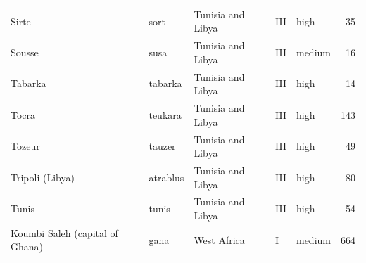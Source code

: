 \documentclass[11pt,a4paper]{article}
\begin{document}
{\begin{longtable}{p{4.6cm}p{3.0cm}p{3.6cm}llr}
Sirte & sort & Tunisia and Libya & III & high & 35\\
Sousse & susa & Tunisia and Libya & III & medium & 16\\
Tabarka & tabarka & Tunisia and Libya & III & high & 14\\
Tocra & teukara & Tunisia and Libya & III & high & 143\\
Tozeur & tauzer & Tunisia and Libya & III & high & 49\\
Tripoli (Libya) & atrablus & Tunisia and Libya & III & high & 80\\
Tunis & tunis & Tunisia and Libya & III & high & 54\\
Koumbi Saleh (capital of Ghana) & gana & West Africa & I & medium & 664\\
\bottomrule\end{longtable}}
\end{document}
